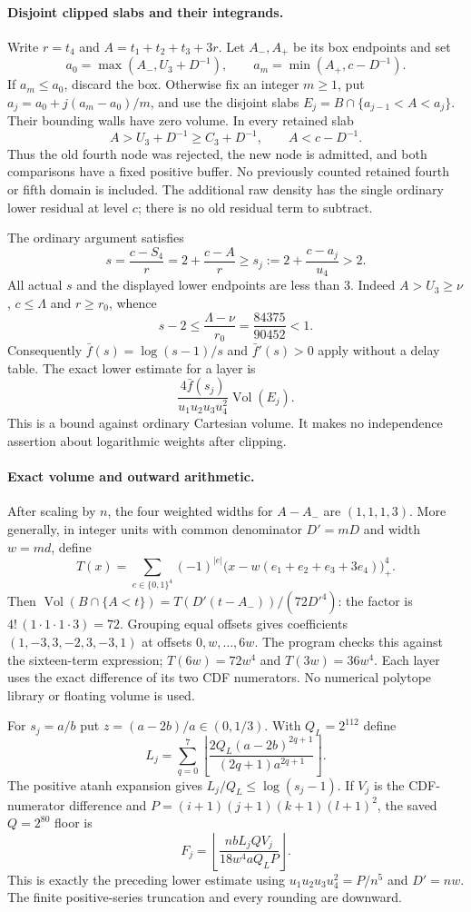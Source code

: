 \paragraph{Disjoint clipped slabs and their integrands.}
Write $r=t_4$ and $A=t_1+t_2+t_3+3r$.  Let $A_-,A_+$ be its
box endpoints and set
\[
 a_0=\max(A_-,U_3+D^{-1}),\qquad
 a_m=\min(A_+,c-D^{-1}).
\]
If $a_m\le a_0$, discard the box.  Otherwise fix an integer
$m\ge1$, put $a_j=a_0+j(a_m-a_0)/m$, and use the disjoint
slabs $E_j=B\cap\{a_{j-1}<A<a_j\}$.  Their bounding walls have
zero volume.  In every retained slab
\[
 A>U_3+D^{-1}\ge C_3+D^{-1},\qquad A<c-D^{-1}.
\]
Thus the old fourth node was rejected, the new node is admitted,
and both comparisons have a fixed positive buffer.  No previously
counted retained fourth or fifth domain is included.  The additional
raw density has the single ordinary lower residual at level $c$;
there is no old residual term to subtract.

The ordinary argument satisfies
\[
 s=\frac{c-S_4}{r}=2+\frac{c-A}{r}
 \ge s_j:=2+\frac{c-a_j}{u_4}>2.
\]
All actual $s$ and the displayed lower endpoints are less than $3$.
Indeed $A>U_3\ge\nu$, $c\le\Lambda$ and $r\ge r_0$, whence
\[
 s-2\le\frac{\Lambda-\nu}{r_0}
 =\frac{84375}{90452}<1.
\]
Consequently $\bar f(s)=\log(s-1)/s$ and $\bar f'(s)>0$ apply
without a delay table.  The exact lower estimate for a layer is
\[
 \frac{4\bar f(s_j)}{u_1u_2u_3u_4^2}\operatorname{Vol}(E_j).
\]
This is a bound against ordinary Cartesian volume.  It makes no
independence assertion about logarithmic weights after clipping.

\paragraph{Exact volume and outward arithmetic.}
After scaling by $n$, the four weighted widths for $A-A_-$ are
$(1,1,1,3)$.  More generally, in integer units with common denominator
$D'=mD$ and width $w=md$, define
\[
 T(x)=\sum_{e\in\{0,1\}^4}(-1)^{|e|}
       \bigl(x-w(e_1+e_2+e_3+3e_4)\bigr)_+^4.
\]
Then $\operatorname{Vol}(B\cap\{A<t\})=
T(D'(t-A_-))/(72D'^4)$: the factor is
$4!\,(1\cdot1\cdot1\cdot3)=72$.
Grouping equal offsets gives coefficients
$(1,-3,3,-2,3,-3,1)$ at offsets $0,w,\ldots,6w$.
The program checks this against the sixteen-term expression;
$T(6w)=72w^4$ and $T(3w)=36w^4$.
Each layer uses the exact difference of its two CDF numerators.
No numerical polytope library or floating volume is used.

For $s_j=a/b$ put $z=(a-2b)/a\in(0,1/3)$.
With $Q_L=2^{112}$ define
\[
 L_j=\sum_{q=0}^{7}\left\lfloor
       \frac{2Q_L(a-2b)^{2q+1}}{(2q+1)a^{2q+1}}\right\rfloor.
\]
The positive atanh expansion gives $L_j/Q_L\le\log(s_j-1)$.
If $V_j$ is the CDF-numerator difference and
$P=(i+1)(j+1)(k+1)(l+1)^2$, the saved $Q=2^{80}$ floor is
\[
 F_j=\left\lfloor
       \frac{n b L_j Q V_j}{18w^4 a Q_L P}\right\rfloor.
\]
This is exactly the preceding lower estimate using
$u_1u_2u_3u_4^2=P/n^5$ and $D'=nw$.
The finite positive-series truncation and every rounding are downward.

